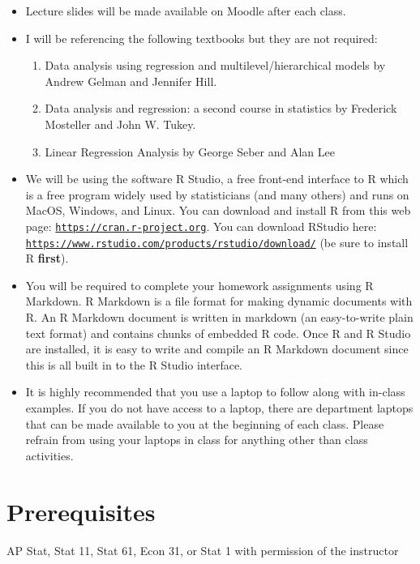 \documentclass[11pt]{article}
\begin{document}
	\begin{itemize}
		\item Lecture slides will be made available on Moodle after each class. 
				\item I will be referencing the following textbooks but they are not required:
		\begin{enumerate}
			\item Data analysis using regression and multilevel/hierarchical models by Andrew Gelman and Jennifer Hill.
			\item Data analysis and regression: a second course in statistics by Frederick Mosteller and John W. Tukey.
			\item Linear Regression Analysis by George Seber and Alan Lee
		\end{enumerate}
		\item We will be using the software R Studio, a free front-end interface to R which is a free program widely used by statisticians (and many others) and runs on MacOS, Windows, and Linux. You can download and install R from this web page: \href{https://cran.r-project.org}{\tt https://cran.r-project.org}. You can download RStudio here: \href{https://www.rstudio.com/products/rstudio/download/}{\tt https://www.rstudio.com/products/rstudio/download/} (be sure to install R \textbf{first}).
		\item You will be required to complete your homework assignments using R Markdown. R Markdown is a file format for making dynamic documents with R. An R Markdown document is written in markdown (an easy-to-write plain text format) and contains chunks of embedded R code. Once R and R Studio are installed, it is easy to write and compile an R Markdown document since this is all built in to the R Studio interface. 
		\item It is highly recommended that you use a laptop to follow along with in-class examples. If you do not have access to a laptop, there are department laptops that can be made available to you at the beginning of each class. Please refrain from using your laptops in class for anything other than class activities.
	\end{itemize}
	

	\section*{Prerequisites}
	AP Stat, Stat 11, Stat 61, Econ 31, or Stat 1 with permission of the instructor
	
\end{document}
